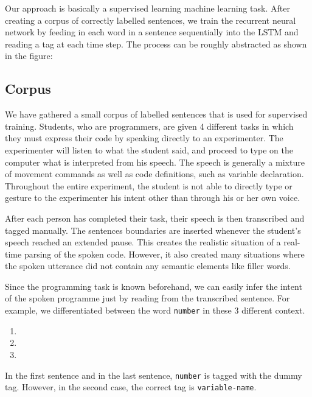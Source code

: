 \documentclass[fyp]{socreport}
\begin{document}
Our approach is basically a supervised learning machine learning task. After
creating a corpus of correctly labelled sentences, we train the recurrent
neural network by feeding in each word in a sentence sequentially into the LSTM
and reading a tag at each time step. The process can be roughly abstracted as
shown in the figure:


\subsection{Corpus}
We have gathered a small corpus of labelled sentences that is used for
supervised training. Students, who are programmers, are given 4 different tasks
in which they must express their code by speaking directly to an experimenter.
The experimenter will listen to what the student said, and proceed to type on
the computer what is interpreted from his speech. The speech is generally a mixture
of movement commands as well as code definitions, such as variable declaration.
Throughout the entire experiment, the student is not able to directly type or
gesture to the experimenter his intent other than through his or her own voice.

After each person has completed their task, their speech is then transcribed
and tagged manually. The sentences boundaries are inserted whenever the student's
speech reached an extended pause. This creates the realistic situation of
a real-time parsing of the spoken code. However, it also created many situations
where the spoken utterance did not contain any semantic elements like filler
words.

Since the programming task is known beforehand, we can easily infer the intent
of the spoken programme just by reading from the transcribed sentence. For example,
we differentiated between the word \texttt{number} in these 3 different context.

\begin{enumerate}
  \item {}    
  \item {}   
      
  \item {}    
\end{enumerate}

In the first sentence and in the last sentence, \texttt{number} is tagged
with the dummy tag. However, in the second case, the correct tag is
\texttt{variable-name}.
\end{document}
